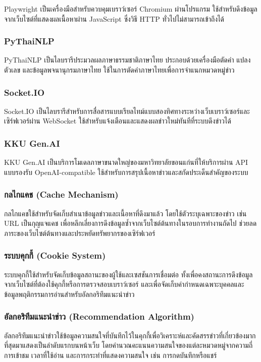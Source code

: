 Playwright เป็นเครื่องมือสำหรับควบคุมเบราว์เซอร์ Chromium ผ่านโปรแกรม ใช้สำหรับดึงข้อมูลจากเว็บไซต์ที่แสดงผลเนื้อหาผ่าน JavaScript ซึ่งวิธี HTTP ทั่วไปไม่สามารถเข้าถึงได้

\subsubsection{PyThaiNLP}

PyThaiNLP เป็นไลบรารีประมวลผลภาษาธรรมชาติภาษาไทย ประกอบด้วยเครื่องมือตัดคำ แปลงตัวเลข และข้อมูลพจนานุกรมภาษาไทย ใช้ในการตัดคำภาษาไทยเพื่อการจำแนกหมวดหมู่ข่าว

\subsubsection{Socket.IO}

Socket.IO เป็นไลบรารีสำหรับการสื่อสารแบบเรียลไทม์แบบสองทิศทางระหว่างเว็บเบราว์เซอร์และเซิร์ฟเวอร์ผ่าน WebSocket ใช้สำหรับแจ้งเตือนและแสดงผลข่าวใหม่ทันทีที่ระบบดึงข่าวได้

\subsubsection{KKU Gen.AI}

KKU Gen.AI เป็นบริการโมเดลภาษาขนาดใหญ่ของมหาวิทยาลัยขอนแก่นที่ให้บริการผ่าน API แบบรองรับ OpenAI-compatible ใช้สำหรับการสรุปเนื้อหาข่าวและสกัดประเด็นสำคัญของระบบ

\subsubsection{กลไกแคช (Cache Mechanism)}

กลไกแคชใช้สำหรับจัดเก็บสำเนาข้อมูลข่าวและเนื้อหาที่ดึงมาแล้ว โดยใช้ตัวระบุเฉพาะของข่าว เช่น URL เป็นกุญแจแคช เพื่อหลีกเลี่ยงการดึงข้อมูลซ้ำจากเว็บไซต์ต้นทางในรอบการทำงานถัดไป ช่วยลดภาระของเว็บไซต์ต้นทางและประหยัดทรัพยากรของเซิร์ฟเวอร์

\subsubsection{ระบบคุกกี้ (Cookie System)}

ระบบคุกกี้ใช้สำหรับจัดเก็บข้อมูลสถานะของผู้ใช้และเซสชันการเชื่อมต่อ ทั้งเพื่อคงสถานะการดึงข้อมูลจากเว็บไซต์ที่ต้องใช้คุกกี้หรือการตรวจสอบเบราว์เซอร์ และเพื่อจัดเก็บค่ากำหนดเฉพาะบุคคลและข้อมูลพฤติกรรมการอ่านสำหรับอัลกอริทึมแนะนำข่าว

\subsubsection{อัลกอริทึมแนะนำข่าว (Recommendation Algorithm)}

อัลกอริทึมแนะนำข่าวใช้ข้อมูลความสนใจที่บันทึกไว้ในคุกกี้เพื่อวิเคราะห์และคัดสรรข่าวที่เกี่ยวข้องมากที่สุดมาแสดงเป็นลำดับแรกบนหน้าเว็บ โดยคำนวณคะแนนความสนใจของแต่ละหมวดหมู่จากความถี่การเข้าชม เวลาที่ใช้อ่าน และการกระทำที่แสดงความสนใจ เช่น การกดบันทึกหรือแชร์
